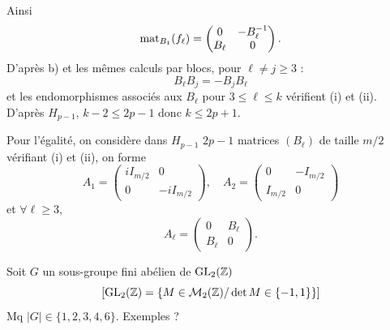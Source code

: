 \begin{solution}
Ainsi
\[
\operatorname{mat}_{B_1}(f_\ell)=
\begin{pmatrix}0&-B_\ell^{-1}\\B_\ell&0\end{pmatrix}.
\]
D'après b) et les mêmes calculs par blocs, pour $\ell\neq j\geq3$ :
\[
B_\ell B_j=-B_jB_\ell
\]
et les endomorphismes associés aux $B_\ell$ pour $3\leq\ell\leq k$ vérifient
(i) et (ii). D'après $H_{p-1}$, $k-2\leq2p-1$ donc $k\leq2p+1$.

Pour l'égalité, on considère dans $H_{p-1}$ $2p-1$ matrices $(B_\ell)$ de
taille $m/2$ vérifiant (i) et (ii), on forme
\[
A_1=\begin{pmatrix}iI_{m/2}&0\\0&-iI_{m/2}\end{pmatrix},\quad
A_2=\begin{pmatrix}0&-I_{m/2}\\I_{m/2}&0\end{pmatrix}
\]
et $\forall \ell\geq3$,
\[
A_\ell=\begin{pmatrix}0&B_\ell\\B_\ell&0\end{pmatrix}.
\]
\end{solution}


\begin{statementbox}
Soit $G$ un sous-groupe fini abélien de $\operatorname{GL}_2(\mathbb Z)$
\[
[\operatorname{GL}_2(\mathbb Z)=\{M\in\mathcal M_2(\mathbb Z)/\det M\in\{-1,1\}\}]
\]
Mq $|G|\in\{1,2,3,4,6\}$. Exemples ?
\end{statementbox}

